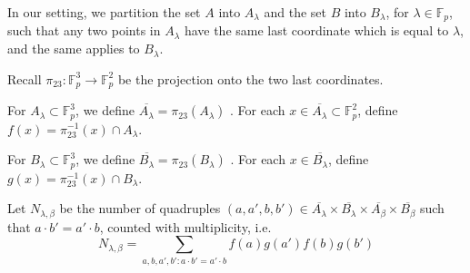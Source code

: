 \documentclass[11pt]{article}
\begin{document}
In our setting, we partition the set $A$ into $A_\lambda$ and the set $B$ into $B_\lambda$, for $\lambda\in \mathbb{F}_p$, such that any two points in $A_\lambda$ have the same last coordinate which is equal to $\lambda$, and the same applies to $B_\lambda$. 

Recall $\pi_{23}\colon \mathbb{F}_p^3\to \mathbb{F}_p^2$ be the projection onto the two last coordinates. 

For $A_\lambda\subset \mathbb{F}_p^3$, we define $\overline{A_\lambda}=\pi_{23}(A_\lambda)$ . For each $x\in \overline{A_\lambda}\subset \mathbb{F}_p^2$, define $f(x)=\pi_{23}^{-1}(x)\cap A_\lambda$.


For $B_\lambda\subset \mathbb{F}_p^3$, we define $\overline{B_\lambda}=\pi_{23}(B_\lambda)$ . For each $x\in \overline{B_\lambda}$, define $g(x)=\pi_{23}^{-1}(x)\cap B_\lambda$.

Let $N_{\lambda, \beta}$ be the number of quadruples $(a, a', b, b')\in \overline{A_\lambda}\times \overline{B_\lambda}\times\overline{A_\beta}\times \overline{B_\beta}$ such that $a\cdot b'=a'\cdot b$, counted with multiplicity, i.e. 
\[N_{\lambda, \beta}=\sum_{a, b, a', b'\colon a\cdot b'=a'\cdot b}f(a)g(a')f(b)g(b')\]
\end{document}
